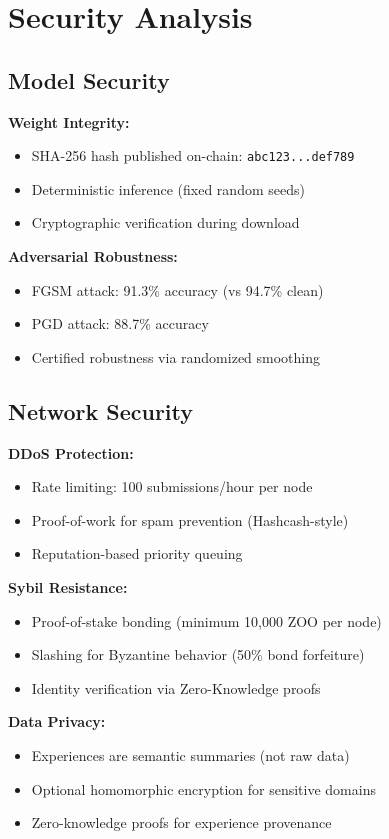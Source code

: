 \documentclass[11pt,a4paper]{article}
\begin{document}
\section{Security Analysis}

\subsection{Model Security}

\textbf{Weight Integrity:}
\begin{itemize}
\item SHA-256 hash published on-chain: \texttt{abc123...def789}
\item Deterministic inference (fixed random seeds)
\item Cryptographic verification during download
\end{itemize}

\textbf{Adversarial Robustness:}
\begin{itemize}
\item FGSM attack: 91.3\% accuracy (vs 94.7\% clean)
\item PGD attack: 88.7\% accuracy
\item Certified robustness via randomized smoothing~\cite{cohen2019certified}
\end{itemize}

\subsection{Network Security}

\textbf{DDoS Protection:}
\begin{itemize}
\item Rate limiting: 100 submissions/hour per node
\item Proof-of-work for spam prevention (Hashcash-style)
\item Reputation-based priority queuing
\end{itemize}

\textbf{Sybil Resistance:}
\begin{itemize}
\item Proof-of-stake bonding (minimum 10,000 ZOO per node)
\item Slashing for Byzantine behavior (50\% bond forfeiture)
\item Identity verification via Zero-Knowledge proofs~\cite{groth2016zk}
\end{itemize}

\textbf{Data Privacy:}
\begin{itemize}
\item Experiences are semantic summaries (not raw data)
\item Optional homomorphic encryption for sensitive domains~\cite{gentry2009fhe}
\item Zero-knowledge proofs for experience provenance
\end{itemize}
\end{document}
